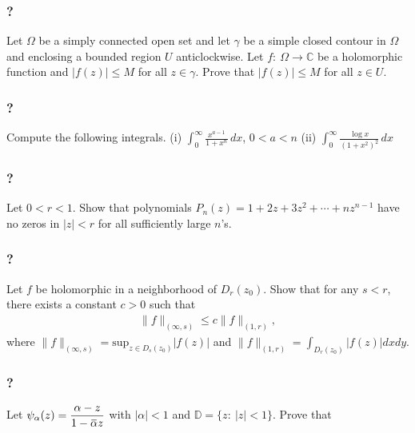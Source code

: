 \hypertarget{section-182}{%
\subsubsection{?}\label{section-182}}

Let \(\Omega\) be a simply connected open set and let \(\gamma\) be a
simple closed contour in \(\Omega\) and enclosing a bounded region \(U\)
anticlockwise. Let \(f: \ \Omega \to {\mathbb C}\) be a holomorphic
function and \(|f(z)|\leq M\) for all \(z\in \gamma\). Prove that
\(|f(z)|\leq M\) for all \(z\in U\).

\hypertarget{section-183}{%
\subsubsection{?}\label{section-183}}

Compute the following integrals. (i)
\(\displaystyle \int_0^\infty \frac{x^{a-1}}{1 + x^n} \, dx\),
\(0< a < n\) (ii)
\(\displaystyle \int_0^\infty \frac{\log x}{(1 + x^2)^2}\, dx\)

\hypertarget{section-184}{%
\subsubsection{?}\label{section-184}}

Let \(0<r<1\). Show that polynomials
\(P_n(z) = 1 + 2z + 3 z^2 + \cdots + n z^{n-1}\) have no zeros in
\(|z|<r\) for all sufficiently large \(n\)'s.

\hypertarget{section-185}{%
\subsubsection{?}\label{section-185}}

Let \(f\) be holomorphic in a neighborhood of \(D_r(z_0)\). Show that
for any \(s<r\), there exists a constant \(c>0\) such that
\begin{align*}\|f\|_{(\infty, s)} \leq c \|f\|_{(1, r)},\end{align*}
where
\(\displaystyle \|f\|_{(\infty, s)} = \text{sup}_{z \in D_s(z_0)}|f(z)|\)
and \(\displaystyle \|f\|_{(1, r)} = \int_{D_r(z_0)} |f(z)|dx dy\).

\hypertarget{section-186}{%
\subsubsection{?}\label{section-186}}

Let
\(\displaystyle{\psi_{\alpha}(z)=\frac{\alpha-z}{1-\mkern 1.5mu\overline{\mkern-1.5mu\alpha\mkern-1.5mu}\mkern 1.5muz}}\)
with \(|\alpha|<1\) and \({\mathbb D}=\{z:\ |z|<1\}\). Prove that

